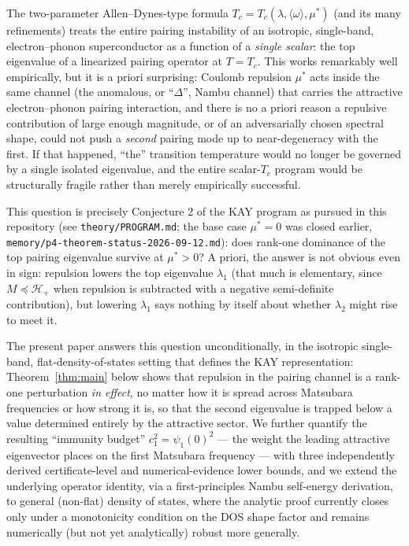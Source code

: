 \documentclass[11pt]{article}
\newcommand{\HH}{\mathcal{H}}
\begin{document}
The two-parameter Allen--Dynes-type formula $T_c=T_c(\lambda,\langle\omega\rangle,\mu^*)$
(and its many refinements) treats the entire pairing instability of an
isotropic, single-band, electron--phonon superconductor as a function of a
\emph{single scalar}: the top eigenvalue of a linearized pairing operator at
$T=T_c$. This works remarkably well empirically, but it is a priori surprising:
Coulomb repulsion $\mu^*$ acts inside the same channel (the anomalous, or
``$\Delta$'', Nambu channel) that carries the attractive electron--phonon
pairing interaction, and there is no a priori reason a repulsive contribution
of large enough magnitude, or of an adversarially chosen spectral shape,
could not push a \emph{second} pairing mode up to near-degeneracy with the
first. If that happened, ``the'' transition temperature would no longer be
governed by a single isolated eigenvalue, and the entire scalar-$T_c$
program would be structurally fragile rather than merely empirically
successful.

This question is precisely Conjecture 2 of the KAY program as pursued in this
repository (see \texttt{theory/PROGRAM.md}; the base case $\mu^*=0$ was closed
earlier, \texttt{memory/p4-theorem-status-2026-09-12.md}): does rank-one
dominance of the top pairing eigenvalue survive at $\mu^*>0$? A priori, the
answer is not obvious even in sign: repulsion lowers the top eigenvalue
$\lambda_1$ (that much is elementary, since $M\preceq\HH_+$ when repulsion is
subtracted with a negative semi-definite contribution), but lowering
$\lambda_1$ says nothing by itself about whether $\lambda_2$ might rise to
meet it.

The present paper answers this question unconditionally, in the isotropic
single-band, flat-density-of-states setting that defines the KAY
representation: Theorem~\ref{thm:main} below shows that repulsion in the
pairing channel is a rank-one perturbation \emph{in effect}, no matter how it
is spread across Matsubara frequencies or how strong it is, so that the second
eigenvalue is trapped below a value determined entirely by the attractive
sector. We further quantify the resulting ``immunity budget''
$c_1^2=\psi_1(0)^2$ --- the weight the leading attractive eigenvector places
on the first Matsubara frequency --- with three independently derived
certificate-level and numerical-evidence lower bounds, and we extend the
underlying operator identity, via a first-principles Nambu self-energy
derivation, to general (non-flat) density of states, where the analytic proof
currently closes only under a monotonicity condition on the DOS shape factor
and remains numerically (but not yet analytically) robust more generally.
\end{document}

